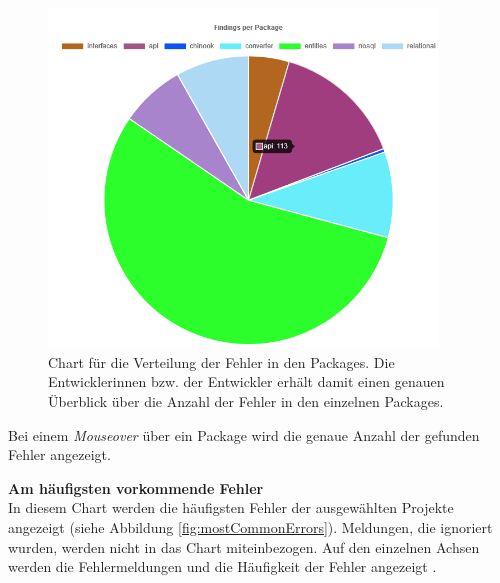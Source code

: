 \begin{figure}[tp]
  \centering
  \includegraphics[height=9cm]{images/findingsPerPackage.PNG}
 \caption[Chart für die Verteilung der Fehler in den Packages.]{Chart für die Verteilung der Fehler in den Packages. Die Entwicklerinnen bzw. der Entwickler erhält damit einen genauen Überblick über die Anzahl der Fehler in den einzelnen Packages.}
  \label{fig:findingsPackage}
\end{figure}

Bei einem \textit{Mouseover} über ein Package wird die genaue Anzahl der gefunden Fehler angezeigt.

\textbf{Am häufigsten vorkommende Fehler} \\
In diesem Chart werden die häufigsten Fehler der ausgewählten Projekte angezeigt (siehe Abbildung \ref{fig:mostCommonErrors}). Meldungen, die ignoriert wurden, werden nicht in das Chart miteinbezogen. Auf den einzelnen Achsen werden die Fehlermeldungen und die Häufigkeit der Fehler angezeigt .

